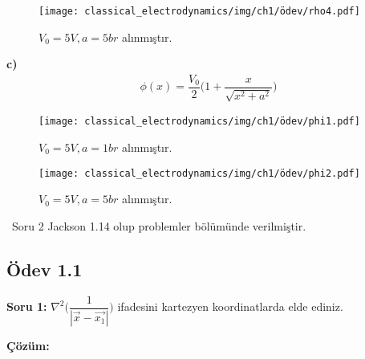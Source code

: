 \newpage
 
   \begin{figure}[h!]
 \centering
\texttt{[image: classical\_electrodynamics/img/ch1/ödev/rho4.pdf]}
\caption*{$V_{0} = 5V, a=5br$ alınmıştır.}
	\end{figure}
 
\textbf{c)}
\begin{align}
    \phi(x) = \dfrac{V_{0}}{2} \Big( 1 + \dfrac{x}{\sqrt{x^{2} + a^{2}}} \Big)
\end{align}
\begin{figure}[h]
 \centering
\texttt{[image: classical\_electrodynamics/img/ch1/ödev/phi1.pdf]}
\caption*{$V_{0} = 5V, a=1br$ alınmıştır.}
	\end{figure}
 \begin{figure}[h!]
 \centering
\texttt{[image: classical\_electrodynamics/img/ch1/ödev/phi2.pdf]}
\caption*{$V_{0} = 5V, a=5br$ alınmıştır.}
	\end{figure}

\dangersign \ Soru 2 Jackson 1.14 olup problemler bölümünde verilmiştir.
\cleardoublepage
\setcounter{equation}{0}
\subsection*{Ödev 1.1}

\begin{flushleft}

  
	\textbf{Soru 1:} $ \nabla^{2} \Big( \dfrac{1}{|\Vec{x} - \Vec{x_{1}}|} \Big) $ ifadesini kartezyen koordinatlarda elde ediniz.

	
\end{flushleft}
   
\noindent \textbf{Çözüm:} 

